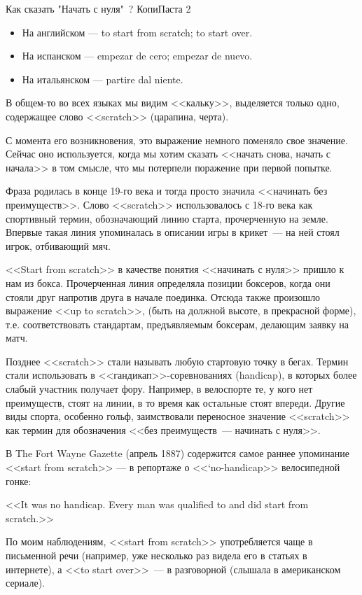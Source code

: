 \begin{news}{2}
	{Как сказать "Начать с нуля"\ ?}
	{}
	{КопиПаста}
	{2}
	
\begin{itemize}
  \item
На английском — to start from scratch; to start over.
  \item
На испанском — empezar de cero; empezar de nuevo.
  \item
На итальянском — partire dal niente.
\end{itemize}

В общем-то во всех языках мы видим <<кальку>>, выделяется только одно,
содержащее слово <<scratch>> (царапина, черта).

С момента его возникновения, это выражение немного поменяло свое значение.
Сейчас оно используется, когда мы хотим сказать <<начать снова, начать с
начала>> в том смысле, что мы потерпели поражение при первой попытке.

Фраза родилась в конце 19-го века и тогда просто значила <<начинать без
преимуществ>>. Слово <<scratch>> использовалось с 18-го века как спортивный
термин, обозначающий линию старта, прочерченную на земле. Впервые такая линия
упоминалась в описании игры в крикет\ --- на ней стоял игрок, отбивающий мяч.

<<Start from scratch>> в качестве понятия <<начинать с нуля>> пришло к нам из
бокса. Прочерченная линия определяла позиции боксеров, когда они стояли друг
напротив друга в начале поединка. Отсюда также произошло выражение <<up to
scratch>>, (быть на должной высоте, в прекрасной форме), т.е. соответствовать
стандартам, предъявляемым боксерам, делающим заявку на матч.

Позднее <<scratch>> стали называть любую стартовую точку в бегах. Термин стали
использовать в <<гандикап>>-соревнованиях (handicap), в которых более слабый
участник получает фору. Например, в велоспорте те, у кого нет преимуществ, стоят
на линии, в то время как остальные стоят впереди. Другие виды спорта, особенно
гольф, заимствовали переносное значение <<scratch>> как термин для обозначения
<<без преимуществ\ --- начинать с нуля>>.

В The Fort Wayne Gazette (апрель 1887) содержится самое раннее упоминание <<start
from scratch>> — в репортаже о <<‘no-handicap>> велосипедной гонке:

<<It was no handicap. Every man was qualified to and did start from scratch.>>

По моим наблюдениям, <<start from scratch>> употребляется чаще в письменной речи
(например, уже несколько раз видела его в статьях в интернете), а <<to start
over>>\ --- в разговорной (слышала в американском сериале).

	
\end{news}

